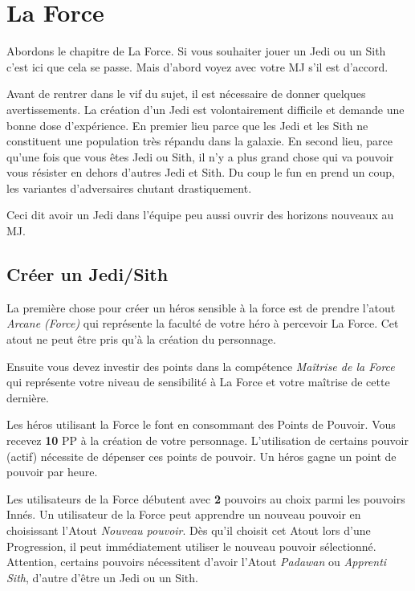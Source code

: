 \section{La Force}
\label{sec:force}

Abordons le chapitre de La Force. Si vous souhaiter jouer un Jedi ou un Sith c’est ici que cela se passe. Mais d’abord voyez avec votre MJ s’il est d’accord.

Avant de rentrer dans le vif du sujet, il est nécessaire de donner quelques avertissements. La création d’un Jedi est volontairement difficile et demande une bonne dose d’expérience. En premier lieu parce que les Jedi et les Sith ne constituent une population très répandu dans la galaxie. En second lieu, parce qu’une fois que vous êtes Jedi ou Sith, il n’y a plus grand chose qui va pouvoir vous résister en dehors d’autres Jedi et Sith. Du coup le fun en prend un coup, les variantes d’adversaires chutant drastiquement.

Ceci dit avoir un Jedi dans l’équipe peu aussi ouvrir des horizons nouveaux au MJ.

\subsection{Créer un Jedi/Sith}
La première chose pour créer un héros sensible à la force est de prendre l’atout \emph{Arcane (Force)} qui représente la faculté de votre héro à percevoir La Force. Cet atout ne peut être pris qu’à la création du personnage.

Ensuite vous devez investir des points dans la compétence \emph{Maîtrise de la Force} qui représente votre niveau de sensibilité à La Force et votre maîtrise de cette dernière.

Les héros utilisant la Force le font en consommant des Points de Pouvoir. Vous recevez \textbf{10} PP à la création de votre personnage. L’utilisation de certains pouvoir (actif) nécessite de dépenser ces points de pouvoir. Un héros gagne un point de pouvoir par heure.

Les utilisateurs de la Force débutent avec \textbf{2} pouvoirs au choix parmi les pouvoirs Innés. Un utilisateur de la Force peut apprendre un nouveau pouvoir en choisissant l’Atout \emph{Nouveau pouvoir}. Dès qu’il choisit cet Atout lors d’une Progression, il peut immédiatement utiliser le nouveau pouvoir sélectionné. Attention, certains pouvoirs nécessitent d’avoir l’Atout \emph{Padawan} ou \emph{Apprenti Sith}, d’autre d’être un Jedi ou un Sith.

